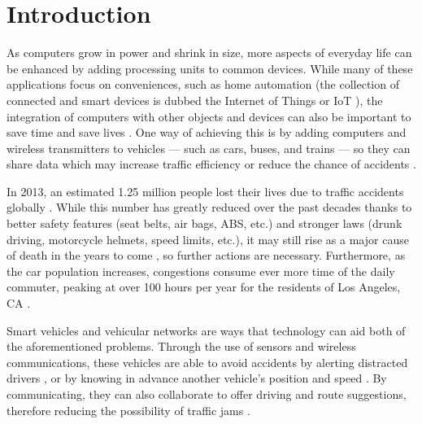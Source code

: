 \chapter{Introduction} 	
\label{chap:introduction}




As computers grow in power and shrink in size, more aspects of everyday life can be enhanced by adding processing units to common devices.
While many of these applications focus on conveniences, such as home automation \citep{mccole2016} (the collection of connected and smart devices is dubbed the Internet of Things or IoT \citep{morgan2014}), the integration of computers with other objects and devices can also be important to save time and save lives \citep{rti2014}.
One way of achieving this is by adding computers and wireless transmitters to vehicles — such as cars, buses, and trains — so they can share data which may increase traffic efficiency or reduce the chance of accidents \citep{saini2015close}.

In 2013, an estimated 1.25 million people lost their lives due to traffic accidents globally \citep{whotraffic}.
While this number has greatly reduced over the past decades \citep{johnson2010traffic} thanks to better safety features (seat belts, air bags, ABS, etc.) and stronger laws (drunk driving, motorcycle helmets, speed limits, etc.), it may still rise as a major cause of death in the years to come \citep{whofactsheet}, so further actions are necessary.
Furthermore, as the car population increases, congestions consume ever more time of the daily commuter, peaking at over 100 hours per year for the residents of Los Angeles, CA \citep{inrixtraffic}.

Smart vehicles and vehicular networks are ways that technology can aid both of the aforementioned problems.
Through the use of sensors and wireless communications, these vehicles are able to avoid accidents by alerting distracted drivers \citep{lee2004collision}, or by knowing in advance another vehicle's position and speed \citep{hafner2011automated}.
By communicating, they can also collaborate to offer driving and route suggestions, therefore reducing the possibility of traffic jams \citep{knorr2012reducing}.

